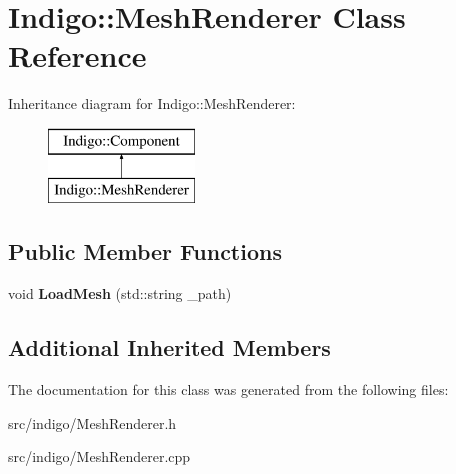 \hypertarget{class_indigo_1_1_mesh_renderer}{}\section{Indigo\+:\+:Mesh\+Renderer Class Reference}
\label{class_indigo_1_1_mesh_renderer}
Inheritance diagram for Indigo\+:\+:Mesh\+Renderer\+:\begin{figure}[H]
\begin{center}
\leavevmode
\includegraphics[height=2.000000cm]{class_indigo_1_1_mesh_renderer}
\end{center}
\end{figure}
\subsection*{Public Member Functions}
\begin{DoxyCompactItemize}
\item 
\mbox{\label{class_indigo_1_1_mesh_renderer_a42321ee7644cfaeee02b5ba2175b2740}} 
void {\bfseries Load\+Mesh} (std\+::string \+\_\+path)
\end{DoxyCompactItemize}
\subsection*{Additional Inherited Members}


The documentation for this class was generated from the following files\+:\begin{DoxyCompactItemize}
\item 
src/indigo/Mesh\+Renderer.\+h\item 
src/indigo/Mesh\+Renderer.\+cpp\end{DoxyCompactItemize}
